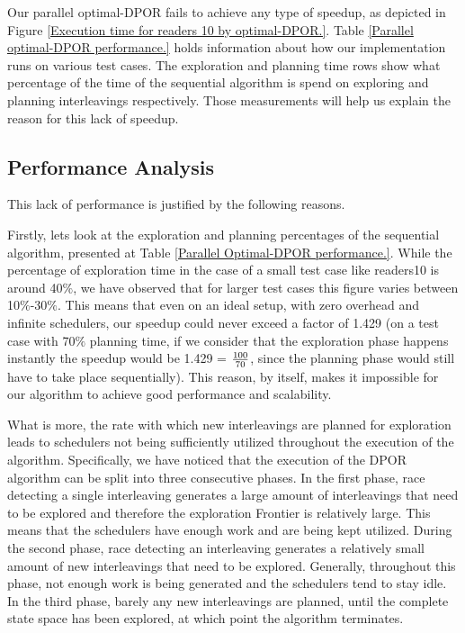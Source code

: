 Our parallel optimal-DPOR fails to achieve any type of speedup, as depicted in Figure 
\ref{Execution time for readers 10 by optimal-DPOR.}. Table \ref{Parallel optimal-DPOR performance.}
holds information about how our implementation runs on various test cases. The exploration and planning
time rows show what percentage of the time of the sequential algorithm is spend on exploring and planning interleavings respectively.
Those measurements will help us explain the reason for this lack of speedup.




\subsection{Performance Analysis}

This lack of performance is justified by the following reasons.

Firstly, lets look at the exploration and planning percentages of the sequential algorithm,
presented at Table \ref{Parallel Optimal-DPOR performance.}. While the percentage of exploration time in the case of a small test
case like readers10 is around 40$\%$, we have observed that for larger test cases this figure varies between 10$\%$-30$\%$. 
This means that even on an ideal setup, with zero overhead and infinite schedulers, our speedup could never exceed a factor
of 1.429 (on a test case with 70$\%$ planning time, if we consider that the exploration phase happens instantly the 
speedup would be 1.429 = $100\over 70$, since the planning phase would still have to take place sequentially). 
This reason, by itself, makes it impossible for our algorithm to achieve good performance and scalability.

What is more, the rate with which new interleavings are planned for exploration leads to schedulers not being sufficiently utilized throughout the execution of the algorithm. Specifically, we have noticed that the execution of the DPOR algorithm can be split into three consecutive phases. In the first phase, race detecting a single interleaving generates a large amount of interleavings that need to be explored and therefore the exploration Frontier is relatively large. This means that the schedulers have enough work and are being kept utilized. During the second phase, race detecting an interleaving generates a relatively small amount of new interleavings that need to be explored. Generally, throughout this phase, not enough work is being generated and the schedulers tend to stay idle. In the third phase,
barely any new interleavings are planned, until the complete state space has been explored, at which point the algorithm terminates. 


